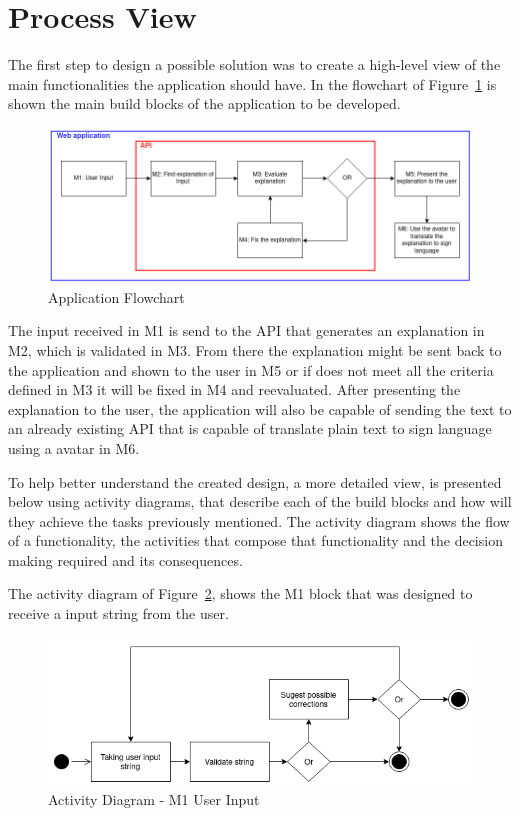 \section{Process View}

The first step to design a possible solution was to create a high-level view of the main functionalities the application should have.
In the flowchart of Figure~\ref{fig:Diagram1} is shown the main build blocks of the application to be developed.

\begin{figure}[H]
\centering
\includegraphics[width=\textwidth,keepaspectratio]{ch4/assets/diagram1_2.png}
\caption[Application Flowchart]{Application Flowchart}
\label{fig:Diagram1}
\end{figure}

The input received in M1 is send to the \gls{API} that generates an explanation in M2, which is validated in M3.
From there the explanation might be sent back to the application and shown to the user in M5  or if does not meet all the criteria defined in M3 it will be fixed in M4 and reevaluated.
After presenting the explanation to the user, the application will also be capable of sending the text to an already existing \gls{API} that is capable of translate plain text to sign language using a avatar in M6.

To help better understand the created design, a more detailed view, is presented below using activity diagrams, that describe each of the build blocks and how will they achieve the tasks previously mentioned.
The activity diagram shows the flow of a functionality, the activities that compose that functionality and the decision making required and its consequences.

The activity diagram of Figure~\ref{fig:M1}, shows the M1 block that was designed to receive a input string from the user.

\begin{figure}[H]
\centering
\includegraphics[width=\textwidth,keepaspectratio]{ch4/assets/M1.png}
\caption[Activity Diagram User Input Module]{Activity Diagram - M1 User Input}
\label{fig:M1}
\end{figure}

